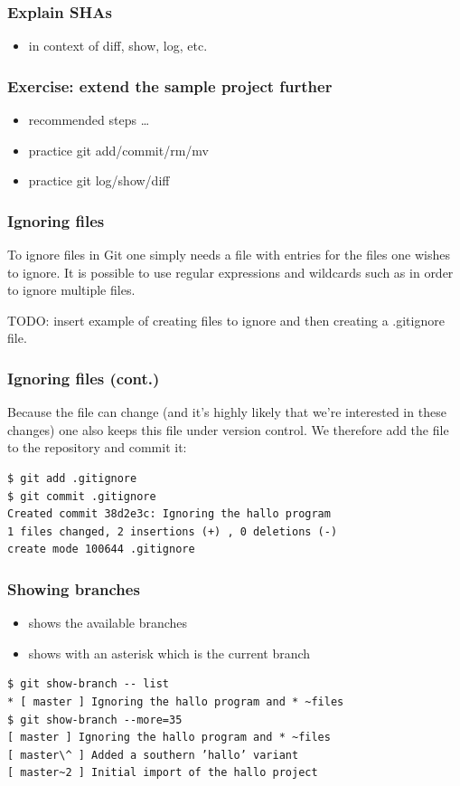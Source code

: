\documentclass{git_course}
\begin{document}
\begin{frame}
\frametitle{Explain SHAs}
\begin{itemize}
    \item in context of diff, show, log, etc.
\end{itemize}
\end{frame}

\begin{frame}
\frametitle{Exercise: extend the sample project further}
\begin{itemize}
    \item recommended steps \ldots
    \item practice git add/commit/rm/mv
    \item practice git log/show/diff
\end{itemize}
\end{frame}

\begin{frame}
\frametitle{Ignoring files}

To ignore files in Git one simply needs a  file with
entries for the files one wishes to ignore. It is possible to use
regular expressions and wildcards such as  in order to ignore
multiple files.

TODO: insert example of creating files to ignore and then creating a
.gitignore file.
\end{frame}

\begin{frame}[fragile]
\frametitle{Ignoring files (cont.)}

Because the  file can change (and it’s highly likely
that we’re interested in these changes) one also keeps this file under
version control. We therefore add the file to the repository and commit
it:

\begin{lstlisting}
$ git add .gitignore
$ git commit .gitignore
Created commit 38d2e3c: Ignoring the hallo program
1 files changed, 2 insertions (+) , 0 deletions (-)
create mode 100644 .gitignore
\end{lstlisting}
\end{frame}

\begin{frame}[fragile]
\frametitle{Showing branches}

\begin{itemize}
    \item shows the available branches
    \item shows with an asterisk \code{*} which is the current branch
\end{itemize}

\begin{lstlisting}
$ git show-branch -- list
* [ master ] Ignoring the hallo program and * ~files
$ git show-branch --more=35
[ master ] Ignoring the hallo program and * ~files
[ master\^ ] Added a southern ’hallo’ variant
[ master~2 ] Initial import of the hallo project
\end{lstlisting}
\end{frame}
\end{document}
